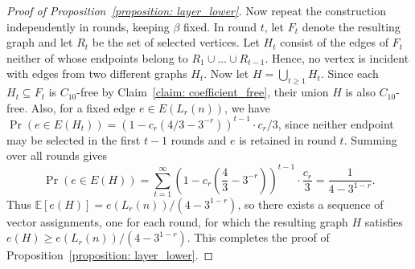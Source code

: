 \documentclass[10pt,a4paper]{amsart}
\begin{document}
\begin{proof}[Proof of Proposition~\ref{proposition: layer_lower}]
Now repeat the construction independently in rounds, keeping $\beta$ fixed. 
In round $t$, let $F_t$ denote the resulting graph and let $R_t$ be the set of selected vertices.
Let $H_t$ consist of the edges of $F_t$ neither of whose endpoints belong to $R_1 \cup \ldots \cup R_{t-1}$.
Hence, no vertex is incident with edges from two different graphs $H_t$. 
Now let $H = \bigcup_{t \geq 1} H_t$. 
Since each $H_t \subseteq F_t$ is $C_{10}$-free by Claim~\ref{claim: coefficient_free}, their union $H$ is also $C_{10}$-free. 
Also, for a fixed edge $e \in E(L_r(n))$, we have $\operatorname{Pr}(e\in E(H_t)) = (1 - c_r(4/3 - 3^{-r}))^{t-1} \cdot c_r/3$, since neither endpoint may be selected in the first $t-1$ rounds and $e$ is retained in round $t$. 
Summing over all rounds gives
\[
    \operatorname{Pr}(e \in E(H)) =\sum_{t=1}^{\infty}
    \left(1-c_r\left(\frac{4}{3} - 3^{-r}\right)\right)^{t-1} \cdot \frac{c_r}{3} = \frac{1}{4-3^{1-r}}.
\]
Thus $\mathbb{E}[e(H)]=e(L_r(n))/(4-3^{1-r})$, so there exists a sequence of vector assignments, one for each round, for which the resulting graph $H$ satisfies $e(H) \geq e(L_r(n))/(4-3^{1-r})$. 
This completes the proof of Proposition~\ref{proposition: layer_lower}.

\end{proof}
\end{document}
